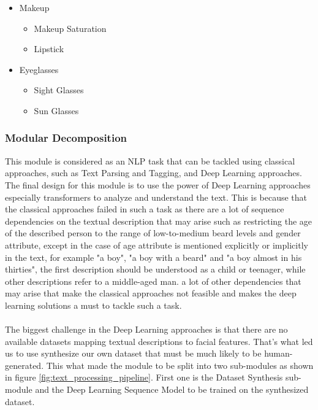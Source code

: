 \begin{itemize}
    \item Makeup
    \begin{itemize}
    	 \item Makeup Saturation            \hspace*{\fill Continuous}
    	 \item Lipstick                     \hspace*{\fill Binary}
    \end{itemize}


    \item Eyeglasses
    \begin{itemize}
    	 \item Sight Glasses                \hspace*{\fill Binary}
    	 \item Sun Glasses                  \hspace*{\fill Binary}
    \end{itemize}

\end{itemize}



\subsubsection{Modular Decomposition}
This module is considered as an NLP task that can be tackled using classical approaches, such as Text Parsing and Tagging, and Deep Learning approaches. The final design for this module is to use the power of Deep Learning approaches especially transformers to analyze and understand the text. This is because that the classical approaches failed in such a task as there are a lot of sequence dependencies on the textual description that may arise such as restricting the age of the described person to the range of low-to-medium beard levels and gender attribute, except in the case of age attribute is mentioned explicitly or implicitly in the text, for example "a boy", "a boy with a beard" and "a boy almost in his thirties", the first description should be understood as a child or teenager, while other descriptions refer to a middle-aged man. a lot of other dependencies that may arise that make the classical approaches not feasible and makes the deep learning solutions a must to tackle such a task. 
\\
\\
The biggest challenge in the Deep Learning approaches is that there are no available datasets mapping textual descriptions to facial features. That’s what led us to use synthesize our own dataset that must be much likely to be human-generated. This what made the module to be split into two sub-modules as shown in figure \ref{fig:text_processing_pipeline}. First one is the Dataset Synthesis sub-module and the Deep Learning Sequence Model to be trained on the synthesized dataset.


